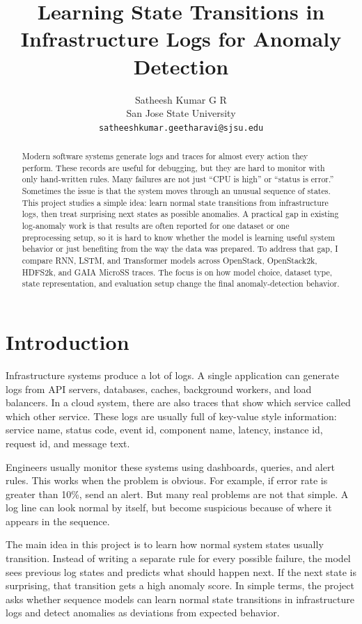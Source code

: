 \documentclass[11pt]{article}
\title{\textbf{Learning State Transitions in Infrastructure Logs for Anomaly Detection}}
\author{
Satheesh Kumar G R\\
San Jose State University\\
\texttt{satheeshkumar.geetharavi@sjsu.edu}
}
\date{}
\begin{document}
\maketitle

\begin{abstract}
Modern software systems generate logs and traces for almost every action they perform. These records are useful for debugging, but they are hard to monitor with only hand-written rules. Many failures are not just ``CPU is high'' or ``status is error.'' Sometimes the issue is that the system moves through an unusual sequence of states. This project studies a simple idea: learn normal state transitions from infrastructure logs, then treat surprising next states as possible anomalies. A practical gap in existing log-anomaly work is that results are often reported for one dataset or one preprocessing setup, so it is hard to know whether the model is learning useful system behavior or just benefiting from the way the data was prepared. To address that gap, I compare RNN, LSTM, and Transformer models across OpenStack, OpenStack2k, HDFS2k, and GAIA MicroSS traces. The focus is on how model choice, dataset type, state representation, and evaluation setup change the final anomaly-detection behavior.
\end{abstract}

\section{Introduction}

Infrastructure systems produce a lot of logs. A single application can generate logs from API servers, databases, caches, background workers, and load balancers. In a cloud system, there are also traces that show which service called which other service. These logs are usually full of key-value style information: service name, status code, event id, component name, latency, instance id, request id, and message text.

Engineers usually monitor these systems using dashboards, queries, and alert rules. This works when the problem is obvious. For example, if error rate is greater than 10\%, send an alert. But many real problems are not that simple. A log line can look normal by itself, but become suspicious because of where it appears in the sequence.

The main idea in this project is to learn how normal system states usually transition. Instead of writing a separate rule for every possible failure, the model sees previous log states and predicts what should happen next. If the next state is surprising, that transition gets a high anomaly score. In simple terms, the project asks whether sequence models can learn normal state transitions in infrastructure logs and detect anomalies as deviations from expected behavior.
\end{document}
